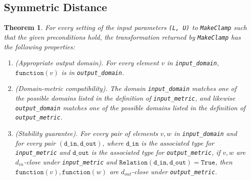 \documentclass[11pt,a4paper]{article}
\newtheorem{theorem}{Theorem}
\theoremstyle{definition}
\newcommand{\din}{\texttt{d\_in}}
\newcommand{\dout}{\texttt{d\_out}}
\newcommand{\Relation}{\texttt{Relation}}
\newcommand{\True}{\texttt{True}}
\newcommand{\function}{\texttt{function}}
\begin{document}
\subsection{Symmetric Distance}
\begin{theorem}
    For every setting of the input parameters \texttt{(L, U)} to \texttt{MakeClamp} such that the given preconditions
    hold, the transformation returned by \texttt{MakeClamp} has the following properties:
    \begin{enumerate}
        \item \textup{(Appropriate output domain).} For every element $v$ in \texttt{input\_domain}, $\function(v)$ is in \texttt{output\_domain}. %
        
        \item \textup{(Domain-metric compatibility).} The domain \texttt{input\_domain} matches one of the possible domains listed in the definition of \texttt{input\_metric}, and likewise \texttt{output\_domain} matches one of the possible domains listed in the definition of \texttt{output\_metric}.
        
        \item \textup{(Stability guarantee).} For every pair of elements $v, w$ in \texttt{input\_domain} and for every pair $(\din, \dout)$, where $\din$ is the associated type for \texttt{input\_metric} and $\dout$ is the associated type for \texttt{output\_metric}, if $v,w$ are $d_{in}$-close under \texttt{input\_metric} and $\Relation(\din, \dout) = \True$, then $\function(v), \function(w)$ are $d_{out}$-close under \texttt{output\_metric}.
    \end{enumerate}
\end{theorem}
\end{document}
